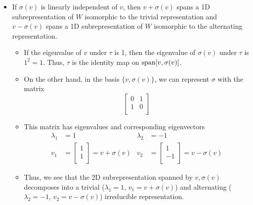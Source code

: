 \documentclass[../notes.tex]{subfiles}
\begin{document}
\begin{itemize}
\begin{itemize}
\begin{itemize}
\begin{itemize}
            \end{itemize}
            \item If $\sigma(v)$ is linearly independent of $v$, then $v+\sigma(v)$ spans a 1D subrepresentation of $W$ isomorphic to the trivial representation and $v-\sigma(v)$ spans a 1D subrepresentation of $W$ isomorphic to the alternating representation.
            \begin{itemize}
                \item If the eigenvalue of $v$ under $\tau$ is 1, then the eigenvalue of $\sigma(v)$ under $\tau$ is $1^2=1$. Thus, $\tau$ is the identity map on $\operatorname{span}[v,\sigma(v)]$.
                \item On the other hand, in the basis $\{v,\sigma(v)\}$, we can represent $\sigma$ with the matrix
                \begin{equation*}
                    \begin{bmatrix}
                        0 & 1\\
                        1 & 0\\
                    \end{bmatrix}
                \end{equation*}
                \item This matrix has eigenvalues and corresponding eigenvectors
                \begin{align*}
                    \lambda_1 &= 1&
                        \lambda_2 &= -1\\
                    v_1 &=
                    \begin{bmatrix}
                        1\\
                        1\\
                    \end{bmatrix}
                    = v+\sigma(v)&
                        v_2 &=
                        \begin{bmatrix}
                            1\\
                            -1\\
                        \end{bmatrix}
                        = v-\sigma(v)
                \end{align*}
                \item Thus, we see that the 2D subrepresentation spanned by $v,\sigma(v)$ decomposes into a trivial ($\lambda_1=1$, $v_1=v+\sigma(v)$) and alternating ($\lambda_2=-1$, $v_2=v-\sigma(v)$) irreducible representation.

\end{itemize}
\end{itemize}
\end{itemize}
\end{itemize}
\end{document}
